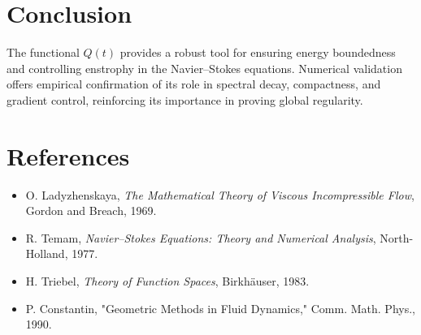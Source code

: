 \documentclass[12pt]{article}
\theoremstyle{definition}
\begin{document}
\section*{Conclusion}
The functional $Q(t)$ provides a robust tool for ensuring energy boundedness and controlling enstrophy in the Navier--Stokes equations. Numerical validation offers empirical confirmation of its role in spectral decay, compactness, and gradient control, reinforcing its importance in proving global regularity.

\section*{References}
\begin{itemize}
    \item O. Ladyzhenskaya, \emph{The Mathematical Theory of Viscous Incompressible Flow}, Gordon and Breach, 1969.
    \item R. Temam, \emph{Navier--Stokes Equations: Theory and Numerical Analysis}, North-Holland, 1977.
    \item H. Triebel, \emph{Theory of Function Spaces}, Birkh\"auser, 1983.
    \item P. Constantin, "Geometric Methods in Fluid Dynamics," Comm. Math. Phys., 1990.
\end{itemize}
\end{document}
